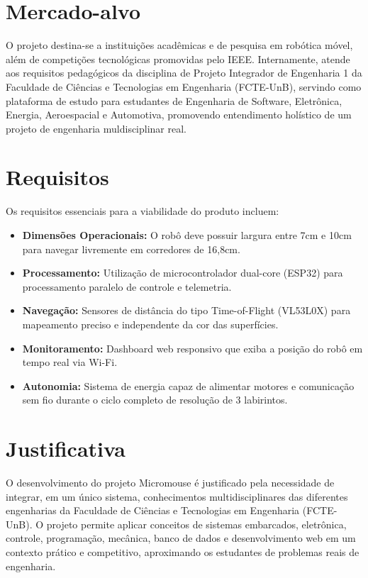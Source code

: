 \section{Mercado-alvo}

O projeto destina-se a instituições acadêmicas e de pesquisa em robótica móvel, além de competições tecnológicas promovidas pelo IEEE. Internamente, atende aos requisitos pedagógicos da disciplina de Projeto Integrador de Engenharia 1 da Faculdade de Ciências e Tecnologias em Engenharia (FCTE-UnB), servindo como plataforma de estudo para estudantes de Engenharia de Software, Eletrônica, Energia, Aeroespacial e Automotiva, promovendo entendimento holístico de um projeto de engenharia muldisciplinar real.

\section{Requisitos}

Os requisitos essenciais para a viabilidade do produto incluem:
\begin{itemize}
    \item \textbf{Dimensões Operacionais:} O robô deve possuir largura entre 7cm e 10cm para navegar livremente em corredores de 16,8cm.
    \item \textbf{Processamento:} Utilização de microcontrolador dual-core (ESP32) para processamento paralelo de controle e telemetria.
    \item \textbf{Navegação:} Sensores de distância do tipo Time-of-Flight (VL53L0X) para mapeamento preciso e independente da cor das superfícies.
    \item \textbf{Monitoramento:} Dashboard web responsivo que exiba a posição do robô em tempo real via Wi-Fi.
    \item \textbf{Autonomia:} Sistema de energia capaz de alimentar motores e comunicação sem fio durante o ciclo completo de resolução de 3 labirintos.
\end{itemize}

\section{Justificativa}

 O desenvolvimento do projeto Micromouse é justificado pela necessidade de integrar, em um único sistema, conhecimentos multidisciplinares das diferentes engenharias da Faculdade de Ciências e Tecnologias em Engenharia (FCTE-UnB). O projeto permite aplicar conceitos de sistemas embarcados, eletrônica, controle, programação, mecânica, banco de dados e desenvolvimento web em um contexto prático e competitivo, aproximando os estudantes de problemas reais de engenharia.

